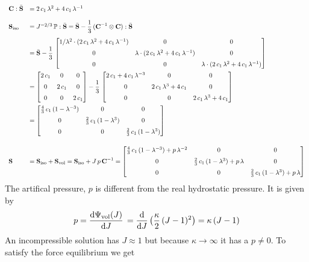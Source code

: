 \begin{equation*}
  \begin{array}{lll}
    \textbf{C} : \bar{\textbf{S}} &= 2\,c_1\,\lambda^2 + 4\,c_1\,\lambda^{-1} \\[4mm]
    \textbf{S}_\text{iso} &= J^{-2/3}\,\mathbb{P} : \bar{\textbf{S}} = \bar{\textbf{S}} - \displaystyle\frac{\displaystyle{1}}{\displaystyle{3}}\, (\textbf{C}^{-1} \otimes \textbf{C}):\bar{\textbf{S}} \\[4mm]
     &= \bar{\textbf{S}} - \displaystyle\frac{\displaystyle{1}}{\displaystyle{3}}\, \left[\begin{matrix}
    1/\lambda^2 \cdot (2\,c_1\,\lambda^2 + 4\,c_1\,\lambda^{-1}) & 0 & 0 \\[2mm]
    0 & \lambda \cdot (2\,c_1\,\lambda^2+ 4\,c_1\,\lambda^{-1}) & 0 \\[2mm]
    0 & 0 & \lambda \cdot (2\,c_1\,\lambda^2+ 4\,c_1\,\lambda^{-1})\end{matrix}\right] \\[8mm]
    &= \left[\begin{matrix}2\,c_1 & 0 & 0\\[2mm] 0 & 2\,c_1 & 0 \\[2mm] 0 & 0 & 2\,c_1\end{matrix}\right] - \displaystyle\frac{\displaystyle{1}}{\displaystyle{3}}\, \left[\begin{matrix}
    2\,c_1 + 4\,c_1\,\lambda^{-3} & 0 & 0 \\[2mm]
    0 & 2\,c_1\,\lambda^3 + 4\,c_1 & 0 \\[2mm]
    0 & 0 & 2\,c_1\,\lambda^3 + 4\,c_1\end{matrix}\right] \\[8mm]
    &= \left[\begin{matrix}
    \frac43\,c_1\,(1-\lambda^{-3}) & 0 & 0 \\[2mm]
    0 & \frac23\,c_1\,(1-\lambda^3) & 0 \\[2mm]
    0 & 0 & \frac23\,c_1\,(1-\lambda^3)\end{matrix}\right]\\[12mm]
    \textbf{S} &= \textbf{S}_\text{iso} + \textbf{S}_\text{vol} = \textbf{S}_\text{iso} + J\,p\,\textbf{C}^{-1} = \left[\begin{matrix}
    \frac43\,c_1\,(1-\lambda^{-3}) + p\,\lambda^{-2} & 0 & 0 \\[2mm]
    0 & \frac23\,c_1\,(1-\lambda^3) + p\,\lambda & 0 \\[2mm]
    0 & 0 & \frac23\,c_1\,(1-\lambda^3) + p\,\lambda\end{matrix}\right]
  \end{array}
\end{equation*}
The artifical pressure, $p$ is different from the real hydrostatic pressure. It is given by
\begin{equation*}
  \begin{array}{lll}
    p = \d{\Psi_\text{vol}(J)}{J} = \d{J} \big(\dfrac{\kappa}{2}(J - 1)^2\big) = \kappa\,(J-1)
  \end{array}
\end{equation*}
An incompressible solution has $J\approx 1$ but because $\kappa \to \infty$ it has a $p \neq 0$.
To satisfy the force equilibrium we get
